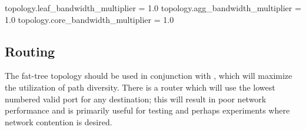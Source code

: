 \begin{ViFile}
topology.leaf_bandwidth_multiplier = 1.0
topology.agg_bandwidth_multiplier = 1.0
topology.core_bandwidth_multiplier = 1.0
\end{ViFile}

\subsection{Routing}
\label{subsec:fattree:routing}

The fat-tree topology should be used in conjunction with , which will maximize the utilization of path diversity.
There is a  router which will use the lowest numbered valid port for any destination; this will result in poor network performance and is primarily useful for testing and perhaps experiments where network contention is desired.
